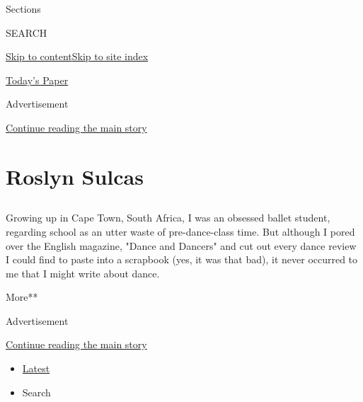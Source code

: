 Sections

SEARCH

\protect\hyperlink{site-content}{Skip to
content}\protect\hyperlink{site-index}{Skip to site index}

\href{https://myaccount.nytimes3xbfgragh.onion/auth/login?response_type=cookie\&client_id=vi}{}

\href{https://www.nytimes3xbfgragh.onion/section/todayspaper}{Today's
Paper}

Advertisement

\protect\hyperlink{after-top}{Continue reading the main story}

\hypertarget{roslyn-sulcas}{%
\section{Roslyn Sulcas}\label{roslyn-sulcas}}

\subsection{}

Growing up in Cape Town, South Africa, I was an obsessed ballet student,
regarding school as an utter waste of pre-dance-class time. But although
I pored over the English magazine, "Dance and Dancers" and cut out every
dance review I could find to paste into a scrapbook (yes, it was that
bad), it never occurred to me that I might write about dance.

More**

Advertisement

\protect\hyperlink{after-mid1}{Continue reading the main story}

\begin{itemize}
\tightlist
\item
  \protect\hyperlink{stream-panel}{Latest}
\item
  Search
\end{itemize}

